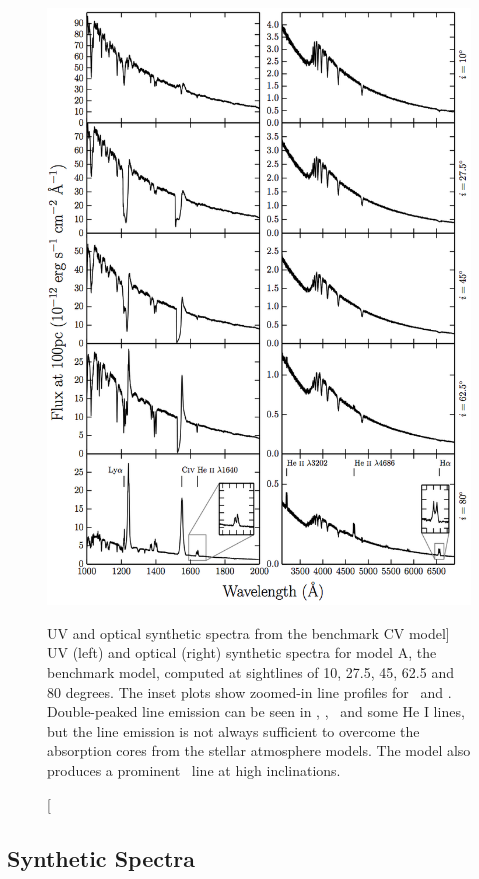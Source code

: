 \begin{figure}
\centering
\includegraphics[width=1.0\textwidth]{figures/05-cvpaper/modela_uv_opt.png}
\caption
[UV and optical synthetic spectra from the benchmark CV model]{
UV (left) and optical (right) synthetic spectra for model A, the benchmark model,
computed at sightlines of 10, 27.5, 45, 62.5 and 80 degrees.	
The inset plots show zoomed-in line profiles for 
\heiiuv\ and \ha. Double-peaked line emission can be seen in 
\heiiuv, \heiiopt, \ha\ and some He I lines, but the 
line emission is not always sufficient to overcome the absorption
cores from the stellar atmosphere models. The model
also produces a prominent \heiioptnew\ line at high inclinations.
}
\label{spec}
\end{figure}



\subsection{Synthetic Spectra}
\label{modela_spectrum}
\label{sec:modela_spectra}

